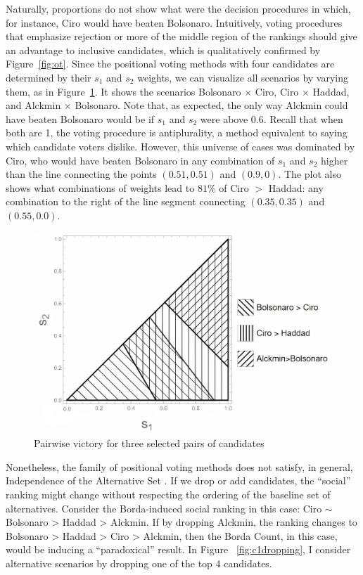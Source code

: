 \documentclass[hidelinks,11pt]{article} \usepackage[utf8]{inputenc}
\begin{document}
Naturally, proportions do not show what were the decision procedures in which,
for instance, Ciro would have beaten Bolsonaro. Intuitively, voting procedures
that emphasize rejection or more of the middle region of the rankings should
give an advantage to inclusive candidates, which is qualitatively confirmed by
Figure~\ref{fig:ot}. Since the positional voting methods with four candidates
are determined by their \(s_{1}\) and \(s_{2}\) weights, we can visualize all
scenarios by varying them, as in Figure~\ref{fig:positional4c}. It shows the
scenarios Bolsonaro \(\times\) Ciro, Ciro \(\times \) Haddad, and Alckmin
\(\times\) Bolsonaro. Note that, as expected, the only way Alckmin could have
beaten Bolsonaro would be if \(s_{1}\) and \(s_{2}\) were above 0.6. Recall that when both are 1, the voting procedure is antiplurality, a method equivalent
to saying which candidate voters dislike. However, this universe of cases was dominated by Ciro, who would have beaten Bolsonaro in any combination of
\(s_{1}\) and \(s_{2}\) higher than the line connecting the points
\((0.51,0.51)\) and \((0.9,0)\). The plot also shows what combinations of
weights lead to \(81\%\) of Ciro \(>\) Haddad: any combination to the right of
the line segment connecting \((0.35,0.35)\) and \((0.55,0.0)\).

\begin{figure}[!h] \centering \includegraphics[width=\columnwidth,
height=0.3\textheight]{./images/counterfactual_triangle.jpg}
\caption{Pairwise victory for three selected pairs of candidates}
 \label{fig:positional4c}
\end{figure}


Nonetheless, the family of positional voting methods does not satisfy, in
general, Independence of the Alternative Set \parencite{kaminski2015empirical}.
If we drop or add candidates, the ``social'' ranking might change without
respecting the ordering of the baseline set of alternatives. Consider the
Borda-induced social ranking in this case: Ciro \( \sim \) Bolsonaro > Haddad >
Alckmin. If by dropping Alckmin, the ranking changes to Bolsonaro > Haddad >
Ciro > Alckmin, then the Borda Count, in this case, would be inducing a
``paradoxical'' result. In Figure ~\ref{fig:c1dropping}, I consider alternative
scenarios by dropping one of the top 4 candidates.
\end{document}
